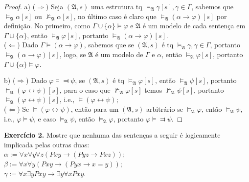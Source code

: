 \documentclass[11pt]{article}
\newcommand{\mf}[1]{\mathfrak{#1}}
\begin{document}
\begin{proof}
    a) ($\Rightarrow$) Seja $(\mf{A},s)$ uma estrutura tq $\vDash_\mf{A}\gamma[s],\gamma\in\Gamma$, sabemos que $\vDash_\mf{A}\alpha[s]$ ou $\nvDash_\mf{A}\alpha[s]$, no último caso é claro que $\vDash_\mf{A}(\alpha\to\varphi)[s]$ por definição. No primeiro, como $\Gamma\cup\{\alpha\}\vDash\varphi$ e $\mf{A}$ é um modelo de cada sentença em $\Gamma\cup\{\alpha\}$, então $\vDash_\mf{A}\varphi[s]$, portanto $\vDash_\mf{A}(\alpha\to\varphi)[s]$.\\
    ($\Leftarrow$) Dado $\Gamma\vDash(\alpha\to\varphi)$, sabemos que se $(\mf{A},s)$ é tq $\vDash_\mf{A}\gamma,\gamma\in\Gamma$, portanto $\vDash_\mf{A}(\alpha\to\varphi)[s]$, logo, se $\mf{A}$ é um modelo de $\Gamma$ e $\alpha$, então $\vDash_\mf{A}\varphi[s]$, portanto $\Gamma\cup\{\alpha\}\vDash\varphi$.
    
    b) ($\Rightarrow$) Dado $\varphi\vDash\Dashv\psi$, se $(\mf{A},s)$ é tq $\vDash_\mf{A}\varphi[s]$, então $\vDash_\mf{A}\psi[s]$, portanto $\vDash_\mf{A}(\varphi\leftrightarrow\psi)[s]$, para o caso que $\nvDash_\mf{A}\varphi[s]$ temos $\nvDash_\mf{A}\psi[s]$, portanto $\vDash_\mf{A}(\varphi\leftrightarrow\psi)[s]$, i.e., $\vDash(\varphi\leftrightarrow\psi)$;\\
    ($\Leftarrow$) Se $\vDash(\varphi\leftrightarrow\psi)$, então para um $(\mf{A},s)$ arbitrário se $\vDash_\mf{A}\varphi$, então $\vDash_\mf{A}\psi$, i.e., $\varphi\vDash\psi$, e caso $\vDash_\mf{A}\psi$, então $\vDash_\mf{A}\varphi$, portanto $\varphi\vDash\Dashv\psi$.
\end{proof}

\begin{shaded}
\textbf{Exercício 2.} Mostre que nenhuma das sentenças a seguir é logicamente implicada pelas outras duas:\\
$\alpha:=\forall x\forall y\forall z(Pxy\to(Pyz\to Pxz))$;\\
$\beta:=\forall x\forall y(Pxy\to(Pyx\to x=y))$;\\
$\gamma:=\forall x\exists yPxy\to\exists y\forall xPxy$.
\end{shaded}
\end{document}
